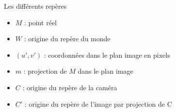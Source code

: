 \begin{frame}[noframenumbering]
    \label{moravec-code}
\end{frame}


\begin{frame}[noframenumbering]{Les différents repères}
  \label{projection-appendix}

\begin{minipage}[c]{0.48\linewidth}
  \centering
  \begin{overlayarea}{0.9\linewidth}{4cm}
    \hspace*{-1cm}
  \end{overlayarea}
\end{minipage}
\hfill
\begin{minipage}[c]{0.48\linewidth}
  \vspace*{\fill}
  \begin{itemize}
    \item<2-> $M$ : point réel
    \item<3-> $W$ : origine du repère du monde
    \item<4-> $(u', v')$ : coordonnées dans le plan image en pixels
    \item<5-> $m$ : projection de $M$ dans le plan image
    \item<6-> $C$ : origine du repère de la caméra
    \item<8-> $C'$ : origine du repère de l'image par projection de C
  \end{itemize}
  \vspace*{\fill}
\end{minipage}
\end{frame}

